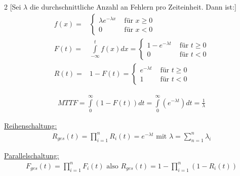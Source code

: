 \documentclass[a4paper, 11pt, accentcolor = tud3b]{tudreport}
\begin{document}
				\begin{multicols}{2}
				[Sei $\lambda$ die durchschnittliche Anzahl an Fehlern pro Zeiteinheit. Dann ist:]				
				\begin{align*}
					f(x)=&
					\begin{cases}
						\lambda e^{-\lambda x} & \text{ für } x\geq0\\
						0 & \text{ für } x<0
					\end{cases}\\
					F(t)=&\int\limits_{-\infty}^t f(x) dx =
					\begin{cases}
						1-e^{-\lambda t} & \text{ für } t\geq0\\
						0 & \text{ für } t<0
					\end{cases}\\
					R(t)=&1-F(t) =
					\begin{cases}
						e^{-\lambda t} & \text{ für } t\geq0\\
						1 & \text{ für } t<0
					\end{cases}
				\end{align*}
				
				\columnbreak
				
				
				\end{multicols}
				
				\begin{align*}
					MTTF = \int\limits_{0}^\infty (1-F(t)) dt = \int\limits_{0}^\infty (e^{-\lambda t}) dt = \frac{1}{\lambda}					
				\end{align*}
				
				\underline{Reihenschaltung:}
				\begin{align*}
					R_{ges}(t)=\prod\limits_{i=1}^nR_i(t)=e^{-\lambda t} \text{ mit } \lambda=\sum\limits_{n=1}^n\lambda_i
				\end{align*}
				
				\underline{Parallelschaltung:}
				\begin{align*}
					F_{ges}(t)=\prod\limits_{i=1}^nF_i(t) \text{ also } R_{ges}(t)=1-\prod\limits_{i=1}^n(1-R_i(t))
				\end{align*}
				
\end{document}
